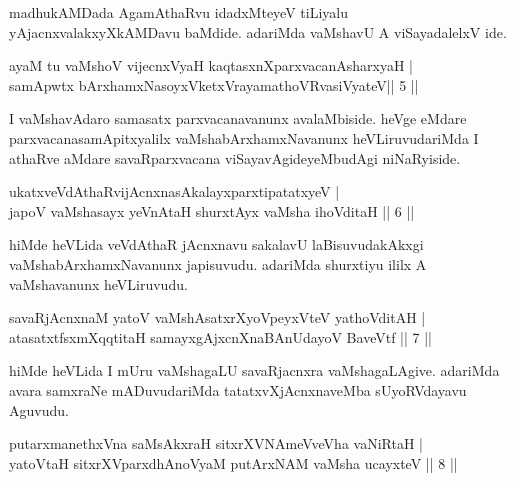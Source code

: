 \begin{artha}
madhukAMDada AgamAthaRvu idadxMteyeV tiLiyalu yAjacnxvalakxyXkAMDavu 
baMdide. adariMda vaMshavU A viSayadalelxV ide.
\end{artha}

\begin{shl}
ayaM tu vaMshoV vijecnxVyaH kaqtasxnXparxvacanAsharxyaH | \\
samApwtx bArxhamxNasoyxVketxVrayamathoVR\s vasiVyateV\hfill ||  5 ||  
\end{shl}

\begin{artha}
I vaMshavAdaro samasatx parxvacanavanunx avalaMbiside. heVge eMdare 
parxvacanasamApitxyalilx vaMshabArxhamxNavanunx heVLiruvudariMda I 
athaRve aMdare savaRparxvacana viSayavAgideyeMbudAgi niNaRyiside.
\end{artha}


\begin{shl}
ukatxveVdAthaRvijAcnxnasAkalayxparxtipatatxyeV | \\
japoV vaMshasayx yeVnAtaH shurxtAyx vaMsha ihoVditaH \hfill||  6 ||  
\end{shl}

\begin{artha}
hiMde heVLida veVdAthaR jAcnxnavu sakalavU laBisuvudakAkxgi 
vaMshabArxhamxNavanunx japisuvudu. adariMda shurxtiyu ililx A 
vaMshavanunx heVLiruvudu.
\end{artha}


\begin{shl}
savaRjAcnxnaM yatoV vaMshAsatxrXyoV\s peyxVteV yathoVditAH | \\
atasatxtfsxmXqqtitaH samayxgAjxcnXnaBAnUdayoV BaveVtf \hfill||  7 ||  
\end{shl}

\begin{artha}
hiMde heVLida I mUru vaMshagaLU savaRjacnxra vaMshagaLAgive. adariMda 
avara samxraNe mADuvudariMda tatatxvXjAcnxnaveMba sUyoRVdayavu Aguvudu.
\end{artha}


\begin{shl}
putarxmanethxVna saMsAkxraH sitxrXVNAmeVveVha vaNiRtaH | \\
yatoV\s taH sitxrXVparxdhAnoV\s yaM putArxNAM vaMsha ucayxteV \hfill||  8 ||  
\end{shl}

